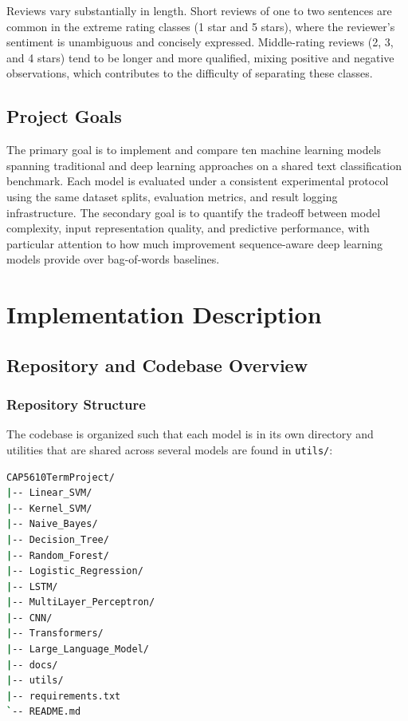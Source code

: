 \documentclass[12pt]{article}
\begin{document}
Reviews vary substantially in length. Short reviews of one to two sentences are common in the extreme rating classes (1 star and 5 stars), where the reviewer's sentiment is unambiguous and concisely expressed. Middle-rating reviews (2, 3, and 4 stars) tend to be longer and more qualified, mixing positive and negative observations, which contributes to the difficulty of separating these classes.

\subsection{Project Goals}

The primary goal is to implement and compare ten machine learning models spanning traditional and deep learning approaches on a shared text classification benchmark. Each model is evaluated under a consistent experimental protocol using the same dataset splits, evaluation metrics, and result logging infrastructure. The secondary goal is to quantify the tradeoff between model complexity, input representation quality, and predictive performance, with particular attention to how much improvement sequence-aware deep learning models provide over bag-of-words baselines.



\section{Implementation Description}

\subsection{Repository and Codebase Overview}

\subsubsection{Repository Structure}

The codebase is organized such that each model is in its own directory and utilities that are shared across several models are found in \texttt{utils/}:

\vspace{0.5em}

\begin{lstlisting}[language=bash]
CAP5610TermProject/
|-- Linear_SVM/
|-- Kernel_SVM/
|-- Naive_Bayes/
|-- Decision_Tree/
|-- Random_Forest/
|-- Logistic_Regression/
|-- LSTM/
|-- MultiLayer_Perceptron/
|-- CNN/
|-- Transformers/
|-- Large_Language_Model/
|-- docs/
|-- utils/
|-- requirements.txt
`-- README.md
\end{lstlisting}
\end{document}
